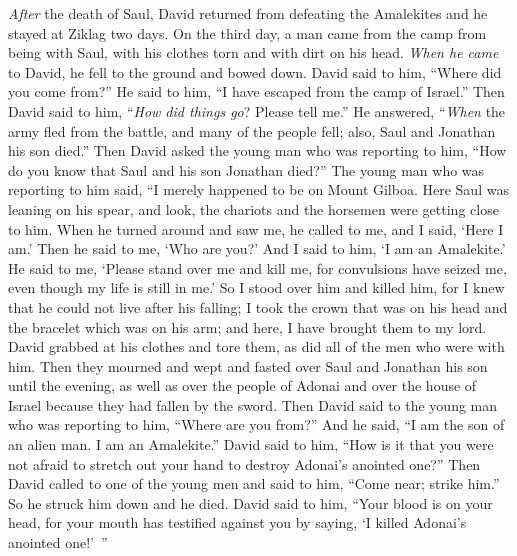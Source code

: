 
\begin{biblechapter} %
 \textit{After} the death of Saul, David returned from defeating the Amalekites and he stayed at Ziklag two days.
\verse On the third day, a man came from the camp from being with Saul, with his clothes torn and with dirt on his head. \textit{When he came} to David, he fell to the ground and bowed down.
\verse David said to him, “Where did you come from?” He said to him, “I have escaped from the camp of Israel.”
\verse Then David said to him, “\textit{How did things go}? Please tell me.” He answered, “\textit{When} the army fled from the battle, and many of the people fell; also, Saul and Jonathan his son died.”
\verse Then David asked the young man who was reporting to him, “How do you know that Saul and his son Jonathan died?”
\verse The young man who was reporting to him said, “I merely happened to be on Mount Gilboa. Here Saul was leaning on his spear, and look, the chariots and the horsemen were getting close to him.
\verse When he turned around and saw me, he called to me, and I said, ‘Here I am.’
\verse Then he said to me, ‘Who are you?’ And I said to him, ‘I am an Amalekite.’
\verse He said to me, ‘Please stand over me and kill me, for convulsions have seized me, even though my life is still in me.’
\verse So I stood over him and killed him, for I knew that he could not live after his falling; I took the crown that was on his head and the bracelet which was on his arm; and here, I have brought them to my lord.
\verse David grabbed at his clothes and tore them, as did all of the men who were with him.
\verse Then they mourned and wept and fasted over Saul and Jonathan his son until the evening, as well as over the people of Adonai and over the house of Israel because they had fallen by the sword.
\verse Then David said to the young man who was reporting to him, “Where are you from?” And he said, “I am the son of an alien man. I am an Amalekite.”
\verse David said to him, “How is it that you were not afraid to stretch out your hand to destroy Adonai’s anointed one?”
\verse Then David called to one of the young men and said to him, “Come near; strike him.” So he struck him down and he died.
\verse David said to him, “Your blood is on your head, for your mouth has testified against you by saying, ‘I killed Adonai’s anointed one!’ ”

\end{biblechapter}
